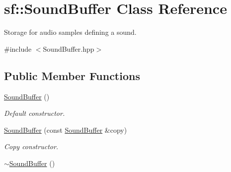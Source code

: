 \hypertarget{classsf_1_1SoundBuffer}{\section{sf\-:\-:Sound\-Buffer Class Reference}
\label{classsf_1_1SoundBuffer}
}


Storage for audio samples defining a sound.  




{\ttfamily \#include $<$Sound\-Buffer.\-hpp$>$}

\subsection*{Public Member Functions}
\begin{DoxyCompactItemize}
\item 
\hypertarget{classsf_1_1SoundBuffer_a0cabfbfe19b831bf7d5c9592d92ef233}{\hyperlink{classsf_1_1SoundBuffer_a0cabfbfe19b831bf7d5c9592d92ef233}{Sound\-Buffer} ()}\label{classsf_1_1SoundBuffer_a0cabfbfe19b831bf7d5c9592d92ef233}

\begin{DoxyCompactList}\small\item\em Default constructor. \end{DoxyCompactList}\item 
\hyperlink{classsf_1_1SoundBuffer_aaf000fc741ff27015907e8588263f4a6}{Sound\-Buffer} (const \hyperlink{classsf_1_1SoundBuffer}{Sound\-Buffer} \&copy)
\begin{DoxyCompactList}\small\item\em Copy constructor. \end{DoxyCompactList}\item 
\hypertarget{classsf_1_1SoundBuffer_aea240161724ffba74a0d6a9e277d3cd5}{\hyperlink{classsf_1_1SoundBuffer_aea240161724ffba74a0d6a9e277d3cd5}{$\sim$\-Sound\-Buffer} ()}\label{classsf_1_1SoundBuffer_aea240161724ffba74a0d6a9e277d3cd5}


\end{DoxyCompactItemize}
